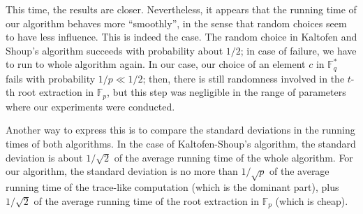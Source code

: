 \documentclass[12pt]{article}
\theoremstyle{plain}
\theoremstyle{definition}
\def\F{\mathbb{F}}
\newcounter{algorithm}
\begin{document}
This time, the results are closer. Nevertheless, it appears that the
running time of our algorithm behaves more ``smoothly'', in the sense that
random choices seem to have less influence. This is indeed the
case. The random choice in Kaltofen and Shoup's algorithm succeeds
with probability about $1/2$; in case of failure, we have to run to
whole algorithm again. In our case, our choice of an element $c$ in
$\F_q^*$ fails with probability $1/p \ll 1/2$; then, there is still
randomness involved in the $t$-th root extraction in $\F_p$, but this
step was negligible in the range of parameters where our experiments
were conducted. 

Another way to express this is to compare the standard deviations in
the running times of both algorithms. In the case of Kaltofen-Shoup's
algorithm, the standard deviation is about $1/\sqrt{2}$ of the average
running time of the whole algorithm. For our algorithm, the standard
deviation is no more than $1/\sqrt{p}$ of the average running time of the
trace-like computation (which is the dominant part), plus $1/\sqrt{2}$
of the average running time of the root extraction in $\F_p$ (which is cheap).





\end{document}
